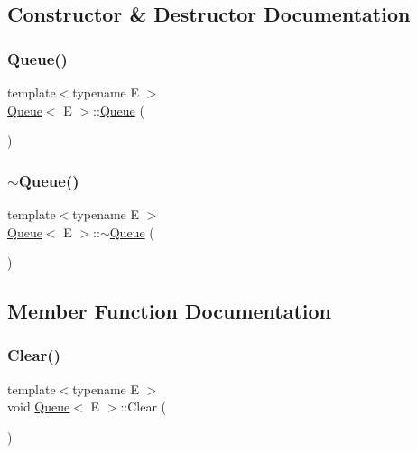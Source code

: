 \subsection{Constructor \& Destructor Documentation}
\mbox{\label{classQueue_ab09891e54b51dc677ee6efb350687ae4}} 
\subsubsection{\texorpdfstring{Queue()}{Queue()}}
{\footnotesize\ttfamily template$<$typename E $>$ \\
\mbox{\hyperlink{classQueue}{Queue}}$<$ E $>$\+::\mbox{\hyperlink{classQueue}{Queue}} (\begin{DoxyParamCaption}{ }\end{DoxyParamCaption})\hspace{0.3cm}{\ttfamily [inline]}}

\mbox{\label{classQueue_a49fe82adb8dc2fb62ab53876a6933d0f}} 
\subsubsection{\texorpdfstring{$\sim$Queue()}{~Queue()}}
{\footnotesize\ttfamily template$<$typename E $>$ \\
\mbox{\hyperlink{classQueue}{Queue}}$<$ E $>$\+::$\sim$\mbox{\hyperlink{classQueue}{Queue}} (\begin{DoxyParamCaption}{ }\end{DoxyParamCaption})\hspace{0.3cm}{\ttfamily [inline]}}



\subsection{Member Function Documentation}
\mbox{\label{classQueue_acfdd5f9f7e936ca30dcf877370ef9510}} 
\subsubsection{\texorpdfstring{Clear()}{Clear()}}
{\footnotesize\ttfamily template$<$typename E $>$ \\
void \mbox{\hyperlink{classQueue}{Queue}}$<$ E $>$\+::Clear (\begin{DoxyParamCaption}{ }\end{DoxyParamCaption})\hspace{0.3cm}{\ttfamily [inline]}}


